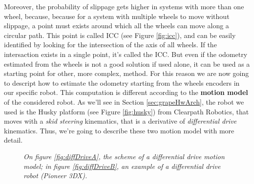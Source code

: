 Moreover, the probability of slippage gets higher in systems with more than one wheel, because, because for a system with multiple wheels to move without slippage, a point must exists around which all the wheels can move along a circular path. This point is called \ac{ICC} (see Figure \ref{fig:icc}), and can be easily identified by looking for the intersection of the axis of all wheels. If the intersaction exists in a single point, it's called the \ac{ICC}.
But even if the odometry estimated from the wheels is not a good solution if used alone, it can be used as a starting point for other, more complex, method. For this reason we are now going to descript how to estimate the odometry starting from the wheels encoders in our specific robot. This computation is different according to the \textbf{motion model} of the considered robot. As we'll see in Section \ref{sec:grapeHwArch}, the robot we used is the Husky platform (see Figure \ref{fig:husky}) from Clearpath Robotics, that moves with a  \textit{skid steering} kinematics, that is a derivative of \textit{differential drive} kinematics. Thus, we're going to describe these two motion model with more detail.

\begin{figure}
	\centering
	\qquad
	\caption{\textit{On figure \ref{fig:diffDriveA}, the scheme of a differential drive motion model; in figure \ref{fig:diffDriveB}, an example of a differential drive robot (Pioneer 3DX).}}
	\label{fig:diffDrive}
\end{figure}


